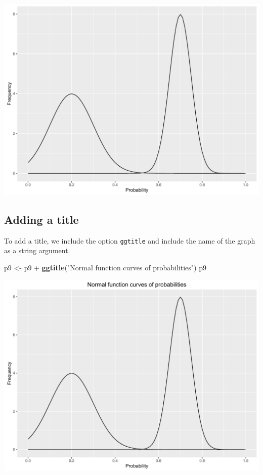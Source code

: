 \documentclass[]{article}
\newenvironment{Shaded}{\begin{snugshade}}{\end{snugshade}}
\newcommand{\KeywordTok}[1]{\textcolor[rgb]{0.13,0.29,0.53}{\textbf{{#1}}}}
\newcommand{\StringTok}[1]{\textcolor[rgb]{0.31,0.60,0.02}{{#1}}}
\newcommand{\NormalTok}[1]{{#1}}
\begin{document}
\begin{center}\includegraphics{0_all_posts_pdf/function_6-1} \end{center}

\subsection{Adding a title}\label{adding-a-title-2}

To add a title, we include the option \texttt{ggtitle} and include the
name of the graph as a string argument.

\begin{Shaded}
\begin{Highlighting}[]
\NormalTok{p9 <-}\StringTok{ }\NormalTok{p9 +}\StringTok{ }\KeywordTok{ggtitle}\NormalTok{(}\StringTok{"Normal function curves of probabilities"}\NormalTok{)}
\NormalTok{p9}
\end{Highlighting}
\end{Shaded}

\begin{center}\includegraphics{0_all_posts_pdf/function_7-1} \end{center}
\end{document}
